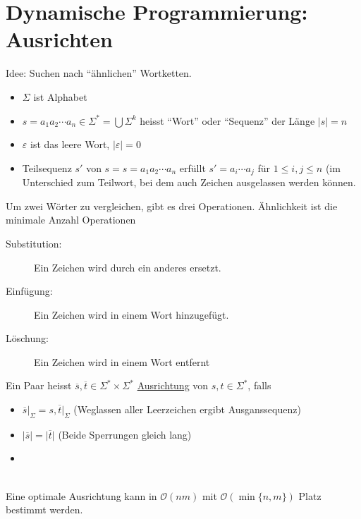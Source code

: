 \documentclass{scrartcl}
\begin{document}
\section{Dynamische Programmierung: Ausrichten}
Idee: Suchen nach "`ähnlichen"' Wortketten.
\begin{shaded}
\begin{itemize}
	\item $\Sigma$ ist Alphabet
	\item $s=a_1a_2\cdots a_n\in\Sigma^*=\bigcup \Sigma^k$ heisst "`Wort"' oder "`Sequenz"' der Länge $\vert s\vert=n$
	\item $\varepsilon$ ist das leere Wort, $\vert\varepsilon\vert=0$
	\item Teilsequenz $s'$ von $s=s=a_1a_2\cdots a_n$ erfüllt $s'=a_i\cdots a_j$ für $1\leq i,j\leq n$ (im Unterschied zum Teilwort, bei dem auch Zeichen ausgelassen werden können.
\end{itemize}
\vspace{2em}
Um zwei Wörter zu vergleichen, gibt es drei Operationen. Ähnlichkeit ist die minimale Anzahl Operationen
\begin{description}
	\item[Substitution:] Ein Zeichen wird durch ein anderes ersetzt.
	\item[Einfügung:] Ein Zeichen wird in einem Wort hinzugefügt.
	\item[Löschung:] Ein Zeichen wird in einem Wort entfernt
\end{description}
\vspace{2em}

Ein Paar heisst $\overline{s},\overline{t}\in\Sigma^*\times\Sigma^*$ \underline{Ausrichtung} von $s,t\in\Sigma^*$, falls
\begin{itemize}
	\item $\overline{s}\vert_\Sigma=s,\overline{t}\vert_\Sigma$ {\tiny (Weglassen aller Leerzeichen ergibt Ausganssequenz)}
	\item $\vert\overline{s}\vert=\vert\overline{t}\vert$ {\tiny (Beide Sperrungen gleich lang)}
	\item {}
\end{itemize}
\vspace{2em}
\end{shaded}

 \\

Eine optimale Ausrichtung kann in $\mathcal{O}(nm)$ mit $\mathcal{O}(\min\{n,m\})$ Platz bestimmt werden.
\end{document}
